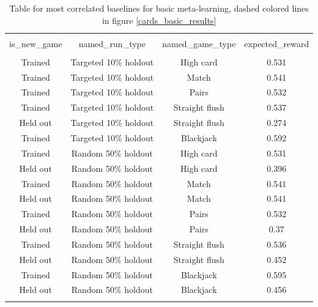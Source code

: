 \documentclass{article}
\begin{document}
\begin{table}[H]
\scriptsize
\centering
\begin{tabular}{@{\extracolsep{5pt}} cccc}
\\[-1.8ex]\hline
\hline \\[-1.8ex]
is\_new\_game & named\_run\_type & named\_game\_type & expected\_reward \\
\hline \\[-1.8ex]
Trained & Targeted 10\% holdout & High card & 0.531 \\
Trained & Targeted 10\% holdout & Match & 0.541 \\
Trained & Targeted 10\% holdout & Pairs & 0.532 \\
Trained & Targeted 10\% holdout & Straight flush & 0.537 \\
Held out & Targeted 10\% holdout & Straight flush & 0.274 \\
Trained & Targeted 10\% holdout & Blackjack & 0.592 \\
Trained & Random 50\% holdout & High card & 0.531 \\
Held out & Random 50\% holdout & High card & 0.396 \\
Trained & Random 50\% holdout & Match & 0.541 \\
Held out & Random 50\% holdout & Match & 0.541 \\
Trained & Random 50\% holdout & Pairs & 0.532 \\
Held out & Random 50\% holdout & Pairs & 0.37 \\
Trained & Random 50\% holdout & Straight flush & 0.536 \\
Held out & Random 50\% holdout & Straight flush & 0.452 \\
Trained & Random 50\% holdout & Blackjack & 0.595 \\
Held out & Random 50\% holdout & Blackjack & 0.456 \\
\hline \\[-1.8ex]
\end{tabular}
\caption{Table for most correlated baselines for basic meta-learning, dashed colored lines in figure \ref{cards_basic_results}}
\end{table}
\end{document}
